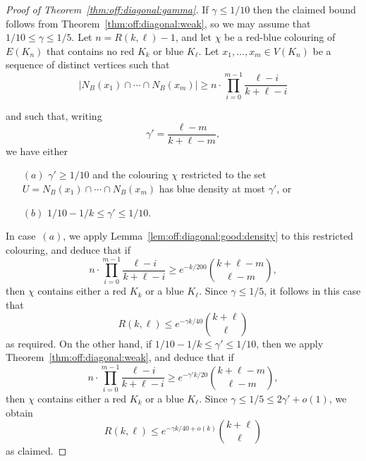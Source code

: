 \documentclass[12pt,reqno]{amsart}
\theoremstyle{definition}
\theoremstyle{remark}
\renewcommand{\le}{\leqslant}
\renewcommand{\ge}{\geqslant}
\begin{document}
\begin{proof}[Proof of Theorem~\ref{thm:off:diagonal:gamma}]
If $\gamma \le 1/10$ then the claimed bound follows from Theorem~\ref{thm:off:diagonal:weak}, so we may assume that $1/10 \le \gamma \le 1/5$. Let $n = R(k,\ell) - 1$,  
and let $\chi$ be a red-blue colouring of $E(K_n)$ that contains no red $K_k$ or blue $K_\ell$. 
Let $x_1,\ldots,x_m \in V(K_n)$ be a sequence of distinct vertices such that
\begin{equation}\label{eq:size:of:U:ESz:steps}
|N_B(x_1) \cap \cdots \cap N_B(x_m)| \ge n \cdot \prod_{i = 0}^{m-1} \frac{\ell - i}{k + \ell - i}
\end{equation}

\pagebreak

\noindent and such that, writing 
$$\gamma' = \frac{\ell - m}{k + \ell - m},$$
we have either 
\begin{itemize}
\item[$(a)$] $\gamma' \ge 1/10$ and the colouring $\chi$ restricted to the set $U = N_B(x_1) \cap \cdots \cap N_B(x_m)$ has blue density at most $\gamma'$, or\smallskip
\item[$(b)$] $1/10 - 1/k \le \gamma' \le 1/10$.
\end{itemize}
In case~$(a)$, we apply Lemma~\ref{lem:off:diagonal:good:density} to this restricted colouring, and deduce that if 
$$n \cdot \prod_{i = 0}^{m-1} \frac{\ell - i}{k + \ell - i} \ge e^{-k/200} {k + \ell - m \choose \ell - m},$$
then $\chi$ contains either a red $K_k$ or a blue $K_\ell$. Since $\gamma \le 1/5$, it follows in this case that
$$R(k,\ell) \le e^{-\gamma k/40} {k + \ell \choose \ell}$$
as required. On the other hand, if $1/10 - 1/k \le \gamma' \le 1/10$, then we apply Theorem~\ref{thm:off:diagonal:weak}, and deduce that if 
$$n \cdot \prod_{i = 0}^{m-1} \frac{\ell - i}{k + \ell - i} \ge e^{-\gamma' k/20} {k + \ell - m \choose \ell - m},$$
then $\chi$ contains either a red $K_k$ or a blue $K_\ell$. Since $\gamma \le 1/5 \le 2\gamma' + o(1)$, we obtain%
$$R(k,\ell) \le e^{-\gamma k/40 + o(k)} {k + \ell \choose \ell}$$
as claimed. 
\end{proof}
\end{document}
